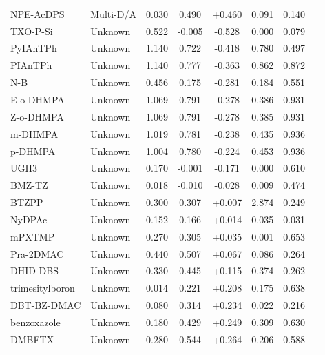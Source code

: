 \begin{longtable}{llcccccc}
NPE-AcDPS & Multi-D/A & 0.030 & 0.490 & +0.460 & 0.091 & 0.140 & \cite{doi101016jdyepig2021109860} \\
TXO-P-Si & Unknown & 0.522 & -0.005 & -0.528 & 0.000 & 0.079 & \cite{doi101016jcej2021133546} \\
PyIAnTPh & Unknown & 1.140 & 0.722 & -0.418 & 0.780 & 0.497 & \cite{doi101016jcej2021131351} \\
PIAnTPh & Unknown & 1.140 & 0.777 & -0.363 & 0.862 & 0.872 & \cite{doi101016jcej2021131351} \\
N-B & Unknown & 0.456 & 0.175 & -0.281 & 0.184 & 0.551 & \cite{doi101016jorgel201604030} \\
E-o-DHMPA & Unknown & 1.069 & 0.791 & -0.278 & 0.386 & 0.931 & \cite{doi101016jdyepig2019108166} \\
Z-o-DHMPA & Unknown & 1.069 & 0.791 & -0.278 & 0.385 & 0.931 & \cite{doi101016jdyepig2019108166} \\
m-DHMPA & Unknown & 1.019 & 0.781 & -0.238 & 0.435 & 0.936 & \cite{doi101016jdyepig2019108166} \\
p-DHMPA & Unknown & 1.004 & 0.780 & -0.224 & 0.453 & 0.936 & \cite{doi101016jdyepig2019108166} \\
UGH3 & Unknown & 0.170 & -0.001 & -0.171 & 0.000 & 0.610 & \cite{doi101039D0QM00429D} \\
BMZ-TZ & Unknown & 0.018 & -0.010 & -0.028 & 0.009 & 0.474 & \cite{doi101016jdyepig201712049} \\
BTZPP & Unknown & 0.300 & 0.307 & +0.007 & 2.874 & 0.249 & \cite{doi101016jorgel201811007} \\
NyDPAc & Unknown & 0.152 & 0.166 & +0.014 & 0.035 & 0.031 & \cite{doi101016jorgel2019105600} \\
mPXTMP & Unknown & 0.270 & 0.305 & +0.035 & 0.001 & 0.653 & \cite{doi101039D0MH01245A} \\
Pra-2DMAC & Unknown & 0.440 & 0.507 & +0.067 & 0.086 & 0.264 & \cite{doi101039D0TC04315J} \\
DHID-DBS & Unknown & 0.330 & 0.445 & +0.115 & 0.374 & 0.262 & \cite{doi101016jjlumin2021118287} \\
trimesitylboron & Unknown & 0.014 & 0.221 & +0.208 & 0.175 & 0.638 & \cite{doi101039C6TC04377A} \\
DBT-BZ-DMAC & Unknown & 0.080 & 0.314 & +0.234 & 0.022 & 0.216 & \cite{doi101039D1TC05906H} \\
benzoxazole & Unknown & 0.180 & 0.429 & +0.249 & 0.309 & 0.630 & \cite{doi101039D2QO00961G} \\
DMBFTX & Unknown & 0.280 & 0.544 & +0.264 & 0.206 & 0.588 & \cite{doi101016jcclet201707025} \\

\end{longtable}
